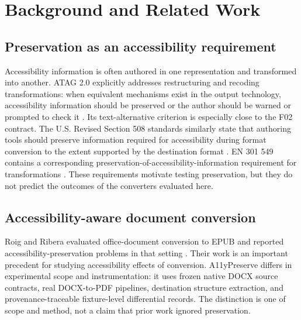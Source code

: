 \section{Background and Related Work}
\label{sec:background}

\subsection{Preservation as an accessibility requirement}

Accessibility information is often authored in one representation and transformed into another. ATAG 2.0 explicitly addresses restructuring and recoding transformations: when equivalent mechanisms exist in the output technology, accessibility information should be preserved or the author should be warned or prompted to check it \cite{atag20}. Its text-alternative criterion is especially close to the F02 contract. The U.S. Revised Section 508 standards similarly state that authoring tools should preserve information required for accessibility during format conversion to the extent supported by the destination format \cite{section508}. EN 301 549 contains a corresponding preservation-of-accessibility-information requirement for transformations \cite{etsi301549}. These requirements motivate testing preservation, but they do not predict the outcomes of the converters evaluated here.

\subsection{Accessibility-aware document conversion}

Roig and Ribera evaluated office-document conversion to EPUB and reported accessibility-preservation problems in that setting \cite{roig2015}. Their work is an important precedent for studying accessibility effects of conversion. A11yPreserve differs in experimental scope and instrumentation: it uses frozen native DOCX source contracts, real DOCX-to-PDF pipelines, destination structure extraction, and provenance-traceable fixture-level differential records. The distinction is one of scope and method, not a claim that prior work ignored preservation.

